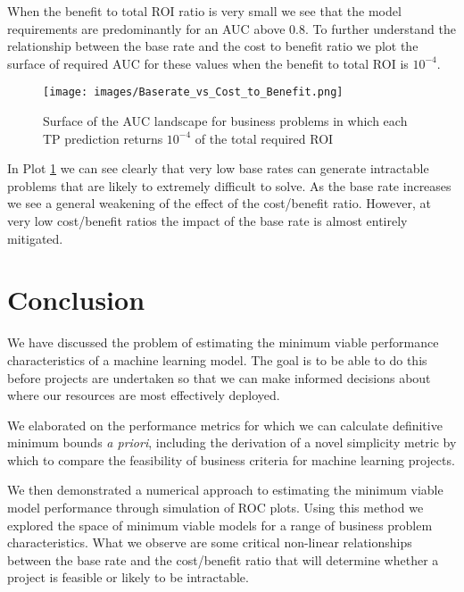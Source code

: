 \documentclass[12pt,a4paper]{article}
\numberwithin{equation}{section}
\begin{document}
When the benefit to total ROI ratio is very small we see that the model requirements are predominantly
for an AUC above $0.8$. To further understand the relationship between the base rate and the cost to benefit ratio
we plot the surface of required AUC for these values when the benefit to total ROI is $10^{-4}$.

\begin{figure}[h!]
\texttt{[image: images/Baserate\_vs\_Cost\_to\_Benefit.png]}
\caption{Surface of the AUC landscape for business problems in which each TP prediction returns
$10^{-4}$ of the total required ROI}
\label{fig:CBRatio}
\end{figure}
 
In Plot \ref{fig:CBRatio} we can see clearly that very low base rates can generate intractable problems that
are likely to extremely difficult to solve. As the base rate increases we see a general weakening of the
effect of the cost/benefit ratio. However, at very low cost/benefit ratios the impact of the base rate
is almost entirely mitigated.

\section{Conclusion}

We have discussed the problem of estimating the minimum viable performance characteristics
of a machine learning model. The goal is to be able to do this before projects are
undertaken so that we can make informed decisions about where our resources are 
most effectively deployed.

We elaborated on the performance metrics for which we can calculate definitive minimum
bounds \textit{a priori}, including the derivation of a novel simplicity metric by which to compare the
feasibility of business criteria for machine learning projects. 

We then demonstrated a numerical approach to estimating the minimum viable model performance through simulation
of ROC plots.
Using this method we explored the space of minimum viable models for a range of business problem characteristics.
What we observe are some critical non-linear 
relationships between the base rate and the cost/benefit ratio that will determine whether a project 
is feasible or likely to be intractable.




\end{document}
